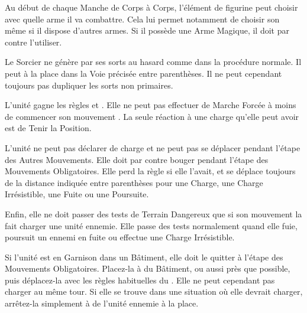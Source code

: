 
Au début de chaque Manche de Corps à Corps, l'élément de figurine peut choisir avec quelle arme il va combattre. Cela lui permet notamment de choisir son \hw{} même si il dispose d'autres armes. Si il possède une Arme Magique, il doit par contre l'utiliser.


Le Sorcier ne génère par ses sorts au hasard comme dans la procédure normale. Il peut à la place  dans la Voie précisée entre parenthèses. Il ne peut cependant toujours pas dupliquer les sorts non primaires.


L'unité gagne les règles \immunetopsychology{} et \unstable{}. Elle ne peut pas effectuer de Marche Forcée à moins de commencer son mouvement . La seule réaction à une charge qu'elle peut avoir est de Tenir la Position.

\newpage
{}

L'unité ne peut pas déclarer de charge et ne peut pas se déplacer pendant l'étape des Autres Mouvements. Elle doit par contre bouger pendant l'étape des Mouvements Obligatoires. Elle perd la règle \swiftstride{} si elle l'avait, et se déplace toujours de la distance indiquée entre parenthèses pour une Charge, une Charge Irrésistible, une Fuite ou une Poursuite.

 Enfin, elle ne doit passer des tests de Terrain Dangereux que si son mouvement la fait charger une unité ennemie. Elle passe des tests normalement quand elle fuie, poursuit un ennemi en fuite ou effectue une Charge Irrésistible.

Si l'unité est en Garnison dans un Bâtiment, elle doit le quitter à l'étape des Mouvements Obligatoires. Placez-la à  du Bâtiment, ou aussi près que possible, puis déplacez-la avec les règles habituelles du \randommovement{}. Elle ne peut cependant pas charger au même tour. Si elle se trouve dans une situation où elle devrait charger, arrêtez-la simplement à  de l'unité ennemie à la place.

